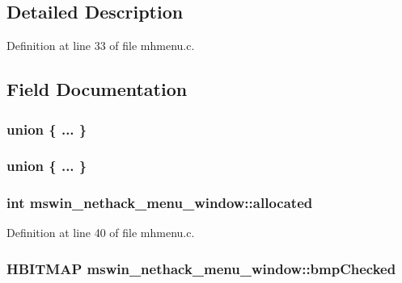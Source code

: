 \subsection{Detailed Description}


Definition at line 33 of file mhmenu.\+c.



\subsection{Field Documentation}
\hypertarget{structmswin__nethack__menu__window_acb34daa24ee66cba23b6a0bbe05cc5cb}{\subsubsection[{"@38}]{\setlength{\rightskip}{0pt plus 5cm}union \{ ... \} }}\label{structmswin__nethack__menu__window_acb34daa24ee66cba23b6a0bbe05cc5cb}
\hypertarget{structmswin__nethack__menu__window_ab2376dc00f6a4898d5ce64b4282450a3}{\subsubsection[{"@50}]{\setlength{\rightskip}{0pt plus 5cm}union \{ ... \} }}\label{structmswin__nethack__menu__window_ab2376dc00f6a4898d5ce64b4282450a3}
\hypertarget{structmswin__nethack__menu__window_a5a753230e20c85057c3f164e1dba7da7}{
\subsubsection[{allocated}]{\setlength{\rightskip}{0pt plus 5cm}int mswin\+\_\+nethack\+\_\+menu\+\_\+window\+::allocated}}\label{structmswin__nethack__menu__window_a5a753230e20c85057c3f164e1dba7da7}


Definition at line 40 of file mhmenu.\+c.

\hypertarget{structmswin__nethack__menu__window_a547aec082271327296a222cd550d0339}{
\subsubsection[{bmp\+Checked}]{\setlength{\rightskip}{0pt plus 5cm}H\+B\+I\+T\+M\+A\+P mswin\+\_\+nethack\+\_\+menu\+\_\+window\+::bmp\+Checked}}\label{structmswin__nethack__menu__window_a547aec082271327296a222cd550d0339}


